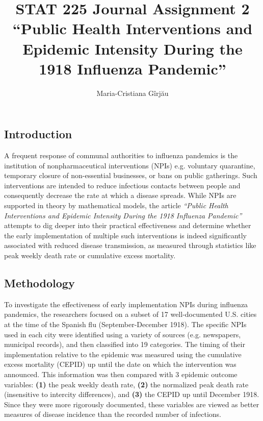 \documentclass{article}
\title{\Huge STAT 225 Journal Assignment 2 \\
\Large ``Public Health Interventions and Epidemic Intensity During the 1918 Influenza Pandemic''}
\author{\Large Maria-Cristiana Gîrjău}
\begin{document}
\maketitle

\begin{multicols}{2}

\subsection*{Introduction}

A frequent response of communal authorities to influenza pandemics is the institution of nonpharmaceutical interventions (NPIs) e.g. voluntary quarantine, temporary closure of non-essential businesses, or bans on public gatherings. Such interventions are intended to reduce infectious contacts between people and consequently decrease the rate at which a disease spreads. While NPIs are supported in theory by mathematical models, the article \textit{``Public Health Interventions and Epidemic Intensity During the 1918 Influenza Pandemic''} \cite{source} attempts to dig deeper into their practical effectiveness and determine whether the early implementation of multiple such interventions is indeed significantly associated with reduced disease transmission, as measured through statistics like peak weekly death rate or cumulative excess mortality.

\subsection*{Methodology}

To investigate the effectiveness of early implementation NPIs during influenza pandemics, the researchers focused on a subset of 17 well-documented U.S. cities at the time of the Spanish flu (September-December 1918). The specific NPIs used in each city were identified using a variety of sources (e.g. newspapers, municipal records), and then classified into 19 categories. The timing of their implementation relative to the epidemic was measured using the cumulative excess mortality (CEPID) up until the date on which the intervention was announced. This information was then compared with 3 epidemic outcome variables: \textbf{(1)} the peak weekly death rate, \textbf{(2)} the normalized peak death rate (insensitive to intercity differences), and \textbf{(3)} the CEPID up until December 1918. Since they were more rigorously documented, these variables are viewed as better measures of disease incidence than the recorded number of infections.


\end{multicols}
\end{document}
